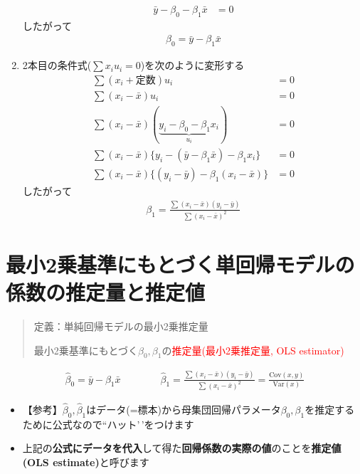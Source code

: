 \documentclass[
]{book}
\providecommand{\tightlist}{%
  \setlength{\itemsep}{0pt}\setlength{\parskip}{0pt}}
\theoremstyle{definition}
\theoremstyle{definition}
\theoremstyle{definition}
\theoremstyle{definition}
\theoremstyle{remark}
\begin{document}
\begin{enumerate}
\begin{align*}
  \bar{y}-\beta_0-\beta_1 \bar{x} &=0
  \end{align*}
  したがって
  \begin{align*}
  \beta_0=\bar{y}-\beta_1 \bar{x}
  \end{align*}
\item
  2本目の条件式(\(\sum x_i u_i=0\))を次のように変形する
  \begin{align*}
  \sum (x_i+\text{定数}) u_i&=0 \\ 
  \sum (x_i-\bar{x}) u_i&=0 \\ 
  \sum (x_i-\bar{x}) (\underbrace{y_i-\beta_0-\beta_1 x_i}_{u_i})&=0 \\ 
  \sum (x_i-\bar{x}) \{ y_i-(\bar{y}-\beta_1 \bar{x})-\beta_1 x_i \}&=0 \\ 
  \sum (x_i-\bar{x}) \{ (y_i-\bar{y})-\beta_1 (x_i-\bar{x}) \}&=0
  \end{align*}
  したがって
  \begin{align*}
  \beta_1=\frac{\sum (x_i-\bar{x})(y_i-\bar{y})}{\sum (x_i-\bar{x})^2}
  \end{align*}
\end{enumerate}

\hypertarget{ux6700ux5c0f2ux4e57ux57faux6e96ux306bux3082ux3068ux3065ux304fux5358ux56deux5e30ux30e2ux30c7ux30ebux306eux4fc2ux6570ux306eux63a8ux5b9aux91cfux3068ux63a8ux5b9aux5024}{%
\section{最小2乗基準にもとづく単回帰モデルの係数の推定量と推定値}\label{ux6700ux5c0f2ux4e57ux57faux6e96ux306bux3082ux3068ux3065ux304fux5358ux56deux5e30ux30e2ux30c7ux30ebux306eux4fc2ux6570ux306eux63a8ux5b9aux91cfux3068ux63a8ux5b9aux5024}}

\begin{quote}
定義：単純回帰モデルの最小2乗推定量

最小2乗基準にもとづく\(\beta_0,\beta_1\)の\textcolor{red}{推定量(最小2乗推定量, OLS estimator)}
\end{quote}

\begin{align*}
\hat\beta_0=\bar{y}-\beta_1 \bar{x}  \qquad\qquad
\hat\beta_1=\frac{\sum (x_i-\bar{x})(y_i-\bar{y})}{\sum (x_i-\bar{x})^2}
=\frac{\text{Cov}(x,y)}{\text{Var}(x)}
\end{align*}

\begin{itemize}
\tightlist
\item
  【参考】\(\hat\beta_0,\hat\beta_1\)はデータ(=標本)から母集団回帰パラメータ\(\beta_0,\beta_1\)を推定するために公式なので``ハット'\,'をつけます
\item
  上記の\textbf{公式にデータを代入}して得た\textbf{回帰係数の実際の値}のことを\textbf{推定値(OLS estimate)}と呼びます
\end{itemize}
\end{document}
